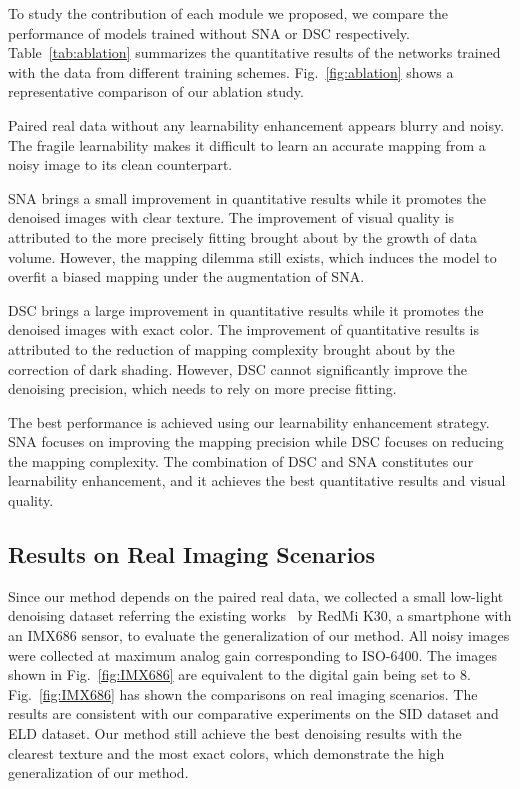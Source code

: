 \documentclass[sigconf,screen,nonacm]{acmart}
\begin{document}
    To study the contribution of each module we proposed, we compare the performance of models trained without SNA or DSC respectively.
    Table~\ref{tab:ablation} summarizes the quantitative results of the networks trained with the data from different training schemes. Fig.~\ref{fig:ablation} shows a representative comparison of our ablation study.

Paired real data without any learnability enhancement appears blurry and noisy. The fragile learnability makes it difficult to learn an accurate mapping from a noisy image to its clean counterpart.


    SNA brings a small improvement in quantitative results while it promotes the denoised images with clear texture.
    The improvement of visual quality is attributed to the more precisely fitting brought about by the growth of data volume.
    However, the mapping dilemma still exists, which induces the model to overfit a biased mapping under the augmentation of SNA.


    DSC brings a large improvement in quantitative results while it promotes the denoised images with exact color.
    The improvement of quantitative results is attributed to the reduction of mapping complexity brought about by the correction of dark shading.
    However, DSC cannot significantly improve the denoising precision, which needs to rely on more precise fitting.
    
The best performance is achieved using our learnability enhancement strategy. SNA focuses on improving the mapping precision while DSC focuses on reducing the mapping complexity. The combination of DSC and SNA constitutes our learnability enhancement, and it achieves the best quantitative results and visual quality.

  \subsection{Results on Real Imaging Scenarios}
Since our method depends on the paired real data, we collected a small low-light denoising dataset referring the existing works~\cite{CVPR17/DND,CVPR18/SID,CVPR18/SIDD,TPAMI21/ELD,ECCV20/Yuzhi} by RedMi K30, a smartphone with an IMX686 sensor, to evaluate the generalization of our method.
All noisy images were collected at maximum analog gain corresponding to ISO-6400. The images shown in Fig.~\ref{fig:IMX686} are equivalent to the digital gain being set to 8.
    Fig.~\ref{fig:IMX686} has shown the comparisons on real imaging scenarios.
The results are consistent with our comparative experiments on the SID dataset and ELD dataset. Our method still achieve the best denoising results with the clearest texture and the most exact colors, which demonstrate the high generalization of our method.
\end{document}
